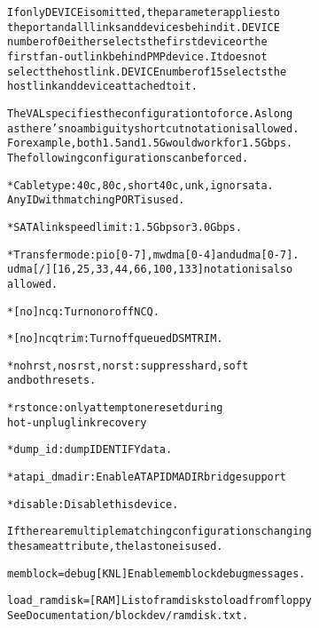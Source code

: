\documentclass[a4paper,8pt,english]{sphinxmanual}
\begin{document}
\begin{alltt}
                        If only DEVICE is omitted, the parameter applies to
                        the port and all links and devices behind it.  DEVICE
                        number of 0 either selects the first device or the
                        first fan-out link behind PMP device.  It does not
                        select the host link.  DEVICE number of 15 selects the
                        host link and device attached to it.

                        The VAL specifies the configuration to force.  As long
                        as there's no ambiguity shortcut notation is allowed.
                        For example, both 1.5 and 1.5G would work for 1.5Gbps.
                        The following configurations can be forced.

                        * Cable type: 40c, 80c, short40c, unk, ign or sata.
                          Any ID with matching PORT is used.

                        * SATA link speed limit: 1.5Gbps or 3.0Gbps.

                        * Transfer mode: pio{[}0-7{]}, mwdma{[}0-4{]} and udma{[}0-7{]}.
                          udma{[}/{]}{[}16,25,33,44,66,100,133{]} notation is also
                          allowed.

                        * {[}no{]}ncq: Turn on or off NCQ.

                        * {[}no{]}ncqtrim: Turn off queued DSM TRIM.

                        * nohrst, nosrst, norst: suppress hard, soft
                          and both resets.

                        * rstonce: only attempt one reset during
                          hot-unplug link recovery

                        * dump\_id: dump IDENTIFY data.

                        * atapi\_dmadir: Enable ATAPI DMADIR bridge support

                        * disable: Disable this device.

                        If there are multiple matching configurations changing
                        the same attribute, the last one is used.

        memblock=debug  {[}KNL{]} Enable memblock debug messages.

        load\_ramdisk=   {[}RAM{]} List of ramdisks to load from floppy
                        See Documentation/blockdev/ramdisk.txt.


\end{alltt}
\end{document}
